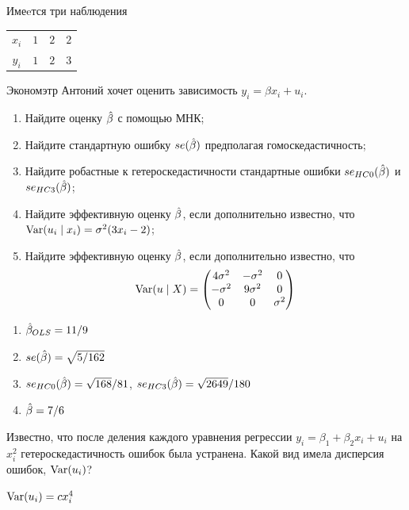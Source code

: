 \begin{problem}
  Имеeтся три наблюдения

  \begin{tabular}{cccc}
    \toprule
  $x_i$ & $1$ & $2$ & $2$ \\
  $y_i$ & $1$ & $2$ & $3$ \\
\bottomrule
  \end{tabular}

  Экономэтр Антоний хочет оценить зависимость $y_i = \beta x_i + u_i$.

  \begin{enumerate}
    \item Найдите оценку $\hat{\beta}$ с помощью МНК;
    \item Найдите стандартную ошибку $se(\hat{\beta})$ предполагая гомоскедастичность;
    \item Найдите робастные к гетероскедастичности стандартные ошибки $se_{HC0}(\hat{\beta})$ и $se_{HC3}(\hat{\beta})$;
    \item Найдите эффективную оценку $\hat{\beta}$, если дополнительно известно, что $\operatorname{Var}(u_i \mid x_i)=\sigma^2(3x_i-2)$;
    \item Найдите эффективную оценку $\hat{\beta}$, если дополнительно известно, что
      \[
    \operatorname{Var}(u \mid X) = \begin{pmatrix}
      4 \sigma^2 & -\sigma^2 & 0 \\
      -\sigma^2 & 9\sigma^2 & 0 \\
      0 & 0 & \sigma^2 \\
    \end{pmatrix}
  \]
  \end{enumerate}

\begin{sol}
\begin{enumerate}
\item $\hat{\beta}_{OLS} = 11/9$
\item $se(\hat{\beta}) = \sqrt{5/162}$
\item $se_{HC0}(\hat{\beta}) = \sqrt{168}/81$, $se_{HC3}(\hat{\beta}) = \sqrt{2649}/180$
\item $\hat{\beta} = 7/6$
\end{enumerate}
\end{sol}
\end{problem}


\begin{problem}
Известно, что после деления каждого уравнения регрессии $y_i = \beta_1 + \beta_2 x_i + u_i$ на $x_i^2$ гетероскедастичность ошибок была устранена. Какой вид имела дисперсия ошибок, $\operatorname{Var}(u_i)$?

\begin{sol}
$\operatorname{Var}(u_i)=cx_i^4$
\end{sol}
\end{problem}



